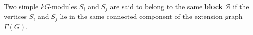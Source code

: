 \begin{definition}[Block]
\label{def:block}
Two simple $kG$-modules $S_i$ and $S_j$ are said to belong to the same \textbf{block} $\mathcal{B}$ if the vertices $S_i$ and $S_j$ lie in the same connected component of the extension graph $\Gamma(G)$.
\end{definition}

